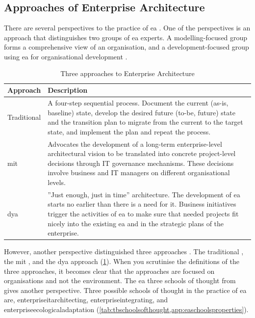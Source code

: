 \subsection{Approaches of Enterprise Architecture}
\label{sub:eaapproaches}
There are several perspectives to the practice of \acrshort{ea} \parencites{Lapalme2012}{Kotusev2015}{Ylinen2018}{Ylinen2020}. One of the perspectives is an approach that distinguishes two groups of \acrshort{ea} experts. A modelling-focused group forms a comprehensive view of an organisation, and a development-focused group using \acrshort{ea} for organisational development \parencites[p.~6]{Ylinen2020}. 
\begin{longtable}{p{}p{}}
	\toprule%
	\textbf{Approach} & \textbf{Description} \\%
	\midrule%
	\endhead%
	\hline
	\endfoot%
	\caption[Three approaches to Enterprise Architecture]{Three approaches to Enterprise Architecture}
	\label{tab:tbthreeapproaches}
	\endlastfoot%
	Traditional & A four-step sequential process. Document the current (as-is, baseline) state, develop the desired future (to-be, future) state and the transition plan to migrate from the current to the target state, and implement the plan and repeat the process. \\%
	\acrshort{mit} & Advocates the development of a long-term enterprise-level architectural vision to be translated into concrete project-level decisions through IT governance mechanisms. These decisions involve business and IT managers on different organisational levels. \\%
	\acrshort{dya} & ''Just enough, just in time'' architecture. The development of \acrshort{ea} starts no earlier than there is a need for it. Business initiatives trigger the activities of 
	\acrshort{ea} to make sure that needed projects fit nicely into the existing \acrshort{ea} and in the strategic plans of the enterprise. \\%
	\bottomrule%
\end{longtable}
However, another perspective distinguished three approaches \parencite[p.~4071]{Kotusev2015}. The traditional \parencite{Spewak1993}, the \acrfull{mit} \parencite{Ross2014}, and the \acrfull{dya} \parencite{Wagter2005} approach \parencite[pp.~4071--4072]{Kotusev2015} (\cref{tab:tbthreeapproaches}). When you scrutinise the definitions of the three approaches, it becomes clear that the approaches are focused on organisations and not the environment. The \acrshort{ea} three schools of thought from \textcite{Lapalme2012} gives another perspective. Three possible schools of thought in the practice of \acrshort{ea} are, \gls{enterpriseitarchitecting}, \gls{enterpriseintegrating}, and \gls{enterpriseecologicaladaptation} \parencite[pp.~38--41]{Lapalme2012} (\cref{tab:tbschoolsofthought,app:easchoolsproperties}).
